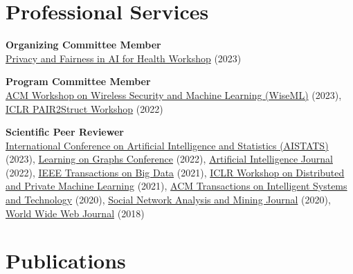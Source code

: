 \documentclass[11pt]{article}
\begin{document}
\section{Professional Services}

\begin{outerlist}
	\item \textbf{Organizing Committee Member}\\
	\href{https://priv-fair-ai-uk.github.io}{Privacy and Fairness in AI for Health Workshop} (2023)

	\item \textbf{Program Committee Member}\\
	\href{https://wisec2023.surrey.ac.uk/wiseml2023/}{ACM Workshop on Wireless Security and Machine Learning (WiseML)} (2023),
	\href{https://pair2struct-workshop.github.io/}{ICLR PAIR2Struct Workshop} (2022)

	\item \textbf{Scientific Peer Reviewer}\\
	\href{http://aistats.org/aistats2023/}{International Conference on Artificial Intelligence and Statistics (AISTATS)} (2023),
	\href{https://logconference.org/}{Learning on Graphs Conference} (2022),
	\href{https://www.journals.elsevier.com/artificial-intelligence}{Artificial Intelligence Journal} (2022),
	\href{https://ieeexplore.ieee.org/xpl/RecentIssue.jsp?punumber=6687317}{IEEE Transactions on Big Data} (2021),
	\href{https://dp-ml.github.io/2021-workshop-ICLR/}{ICLR Workshop on Distributed and Private Machine Learning} (2021),
	\href{https://dl.acm.org/journal/tist}{ACM Transactions on Intelligent Systems and Technology} (2020),
	\href{https://www.springer.com/journal/13278}{Social Network Analysis and Mining Journal} (2020),
	\href{https://www.springer.com/journal/11280}{World Wide Web Journal} (2018)

\end{outerlist}

\section{Publications}
\end{document}
